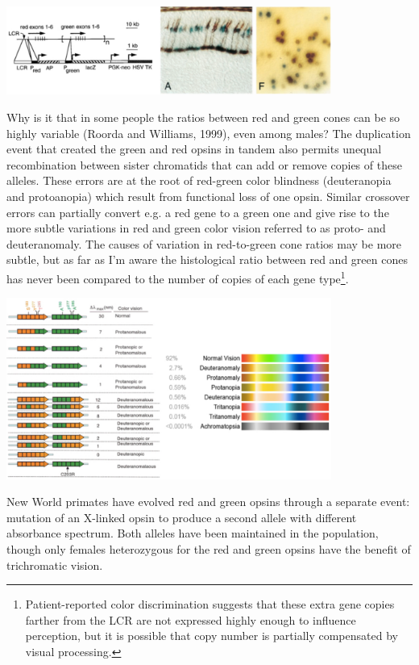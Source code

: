 \documentclass{article}
\begin{document}
\begin{center}
\includegraphics[width=0.8\textwidth]{lcr_in_mice.pdf}
\end{center}

Why is it that in some people the ratios between red and green cones can be so highly variable (Roorda and Williams, 1999), even among males? The duplication event that created the green and red opsins in tandem also permits unequal recombination between sister chromatids that can add or remove copies of these alleles. These errors are at the root of red-green color blindness (deuteranopia and protoanopia) which result from functional loss of one opsin. Similar crossover errors can partially convert e.g. a red gene to a green one and give rise to the more subtle variations in red and green color vision referred to as proto- and deuteranomaly. The causes of variation in red-to-green cone ratios may be more subtle, but as far as I'm aware the histological ratio between red and green cones has never been compared to the number of copies of each gene type\footnote{Patient-reported color discrimination suggests that these extra gene copies farther from the LCR are not expressed highly enough to influence perception, but it is possible that copy number is partially compensated by visual processing.}.

\begin{center}
\includegraphics[width=0.8\textwidth]{anomalies.pdf}
\end{center}

New World primates have evolved red and green opsins through a separate event: mutation of an X-linked opsin to produce a second allele with different absorbance spectrum. Both alleles have been maintained in the population, though only females heterozygous for the red and green opsins have the benefit of trichromatic vision.
\end{document}

